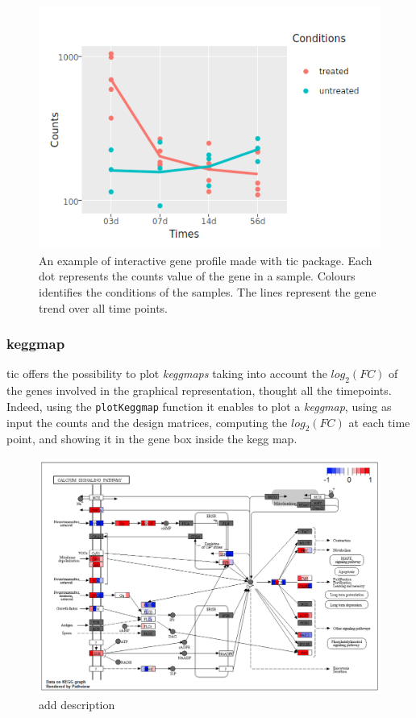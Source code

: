 \begin{figure}[H]
\includegraphics[width=\textwidth,height=\textheight,keepaspectratio]{img/ticorser/gene_trend.png}
\caption[ticorser gene profile]{An example of interactive gene profile made with \gls{tic} package. Each dot represents the counts value of the gene in a sample. Colours identifies the conditions of the samples. The lines represent the gene trend over all time points.}
\label{fig:ticorsergenetrend}
\centering
\end{figure}


\subsubsection{keggmap}
\gls{tic} offers the possibility to plot \textit{keggmaps}\cite{Kanehisa2016} taking into account the $log_2(FC)$ of the genes involved in the graphical representation, thought all the timepoints.
Indeed, using the \lstinline!plotKeggmap! function it enables to plot a \textit{keggmap}, using as input the counts and the design matrices, computing the $log_2(FC)$ at each time point, and showing it in the gene box inside the kegg map.

\begin{figure}[H]
\includegraphics[width=\textwidth,height=\textheight,keepaspectratio]{img/ticorser/keggmap_example.png}
\caption[ticorser keggmap]{add description}
\label{fig:ticorserkeggmap}
\centering
\end{figure}








